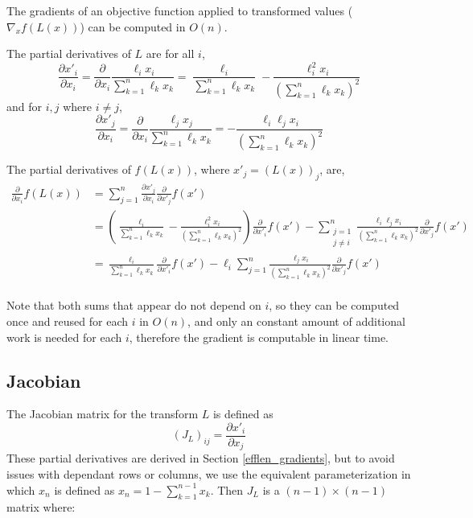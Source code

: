 \documentclass{article}
\begin{document}
The gradients of an objective function applied to transformed values ($\nabla_x
f(L(x))$) can be computed in $O(n)$.


The partial derivatives of $L$ are for all $i$,
$$
\frac{\partial x'_i}{\partial x_i} =
\frac{\partial}{\partial x_i} \frac{\ell_i x_i}{\sum_{k=1}^{n} \ell_k x_k}
= \frac{\ell_i}{\sum_{k=1}^{n} \ell_k x_k}
- \frac{\ell_{i}^2 x_i}{\left( \sum_{k=1}^{n} \ell_k x_k \right)^2}$$
and for $i, j$ where $i \neq j$,
$$
\frac{\partial x'_j}{\partial x_i} =
\frac{\partial}{\partial x_i} \frac{\ell_j x_j}{\sum_{k=1}^{n} \ell_k x_k}
= - \frac{\ell_i \ell_j x_i}{\left( \sum_{k=1}^{n} \ell_k x_k \right)^2}$$


The partial derivatives of $f(L(x))$, where $x'_j = (L(x))_j$, are,
\begin{align*}
\frac{\partial}{\partial x_i} f(L(x)) &=
    \sum_{j=1}^{n} \frac{\partial x'_j}{\partial x_i} \frac{\partial}{\partial x'_j} f(x') \\
&=
    \left(\frac{\ell_i}{\sum_{k=1}^{n} \ell_k x_k}
    - \frac{\ell_{i}^2 x_i}{\left( \sum_{k=1}^{n} \ell_k x_k \right)^2}\right)
    \frac{\partial}{\partial x'_i} f(x')
    - \sum_{\substack{j=1 \\ j \neq i}}^{n}
\frac{\ell_i \ell_j x_i}{\left( \sum_{k=1}^{n} \ell_k x_k \right)^2}
    \frac{\partial}{\partial x'_j} f(x') \\
    &=
\frac{\ell_i}{\sum_{k=1}^{n} \ell_k x_k}  \frac{\partial}{\partial x'_i} f(x')
- \ell_i \sum_{j=1}^{n}
\frac{\ell_j x_i}{\left( \sum_{k=1}^{n} \ell_k x_k \right)^2}
    \frac{\partial}{\partial x'_j} f(x') \\
\end{align*}

Note that both sums that appear do not depend on $i$, so they can be computed
once and reused for each $i$ in $O(n)$, and only an constant amount of
additional work is needed for each $i$, therefore the gradient is computable in
linear time.

\subsection{Jacobian}

The Jacobian matrix for the transform $L$ is defined as
$$ (J_L)_{ij} = \frac{\partial x'_i}{\partial x_j} $$
These partial derivatives are derived in Section \ref{efflen_gradients}, but
to avoid issues with dependant rows or columns, we use the equivalent parameterization in which
$x_n$ is defined as $x_n = 1 - \sum_{k=1}^{n-1} x_k$. Then $J_L$ is a $(n -
1) \times (n - 1)$ matrix where:
\end{document}
